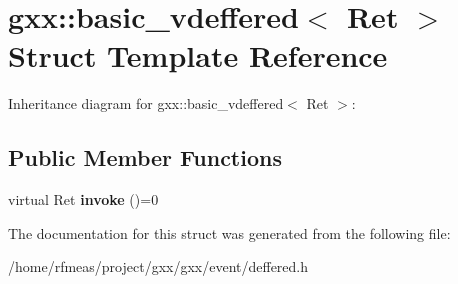 \hypertarget{structgxx_1_1basic__vdeffered}{}\section{gxx\+:\+:basic\+\_\+vdeffered$<$ Ret $>$ Struct Template Reference}
\label{structgxx_1_1basic__vdeffered}


Inheritance diagram for gxx\+:\+:basic\+\_\+vdeffered$<$ Ret $>$\+:
\subsection*{Public Member Functions}
\begin{DoxyCompactItemize}
\item 
virtual Ret {\bfseries invoke} ()=0\hypertarget{structgxx_1_1basic__vdeffered_a6424707a6c1a3886e509137b8e2d3b5b}{}\label{structgxx_1_1basic__vdeffered_a6424707a6c1a3886e509137b8e2d3b5b}

\end{DoxyCompactItemize}


The documentation for this struct was generated from the following file\+:\begin{DoxyCompactItemize}
\item 
/home/rfmeas/project/gxx/gxx/event/deffered.\+h\end{DoxyCompactItemize}
